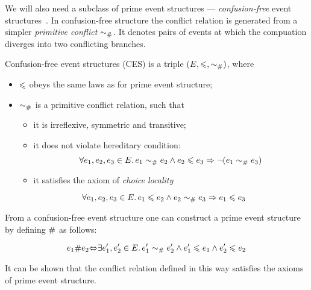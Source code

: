 We will also need a subclass of prime event structures --- 
\emph{confusion-free} event structures~\cite{Nielsen-al:1981}. 
In confusion-free structure the conflict relation is generated from 
a simpler \emph{primitive conflict} $\sim_{\#}$. 
It denotes pairs of events at which the compuation
diverges into two conflicting branches. 

\begin{definition}
Confusion-free event structures (CES) is a triple $(E, \leqslant, \sim_{\#})$, where
\begin{itemize}
  \item $\leqslant$ obeys the same laws as for prime event structure;
  \item $\sim_{\#}$ is a primitive conflict relation, such that
  \begin{itemize}
    \item it is irreflexive, symmetric and transitive;
    \item it does not violate hereditary condition:
    $$ \forall e_1, e_2, e_3 \in E \ldotp 
       e_1 \sim_{\#} e_2 \land e_2 \leqslant e_3 \Rightarrow \neg (e_1 \sim_{\#} e_3) $$
    \item it satisfies the axiom of \emph{choice locality}
  \end{itemize}
    $$ \forall e_1, e_2, e_3 \in E \ldotp e_1 \leqslant e_2 \land e_2 \sim_{\#} e_3 \Rightarrow e_1 \leqslant e_3 $$
\end{itemize}
\end{definition}

From a confusion-free event structure one can construct a prime event structure
by defining $\#$ as follows:

$$ e_1 \# e_2 {\Leftrightarrow} 
   \exists e'_1, e'_2 \in E \ldotp e'_1 \sim_{\#} e'_2 \land
   e'_1 \leqslant e_1 \land e'_2 \leqslant e_2 $$

It can be shown that the conflict relation defined in this way 
satisfies the axioms of prime event structure.





